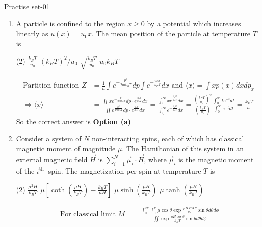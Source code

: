 \newpage
\begin{abox}
	Practise set-01
\end{abox}
\begin{enumerate}
	\item A particle is confined to the region $x \geq 0$ by a potential which increases linearly as $u(x)=u_{0} x$. The mean position of the particle at temperature $T$ is
	 \begin{tasks}(2)
		\task[\textbf{a.}] $\frac{k_{B} T}{u_{0}}$
		\task[\textbf{b.}]$\left(k_{B} T\right)^{2} / u_{0}$
		\task[\textbf{c.}]$\sqrt{\frac{k_{B} T}{u_{0}}}$
		\task[\textbf{d.}]  $u_{0} k_{B} T$
	\end{tasks}
\begin{answer}
	\begin{align*}
	\text{Partition function }Z&=\frac{1}{h} \int e^{-\frac{p^{2}}{2 m k_{B} T}} d p \int e^{-\frac{u_{0} x}{k_{B} T}} d x\text{ and }\langle x\rangle=\int x p(x) d x d p_{x}\\
	\Rightarrow\langle x\rangle&=\frac{\iint x e^{-\frac{p^{2}}{2 m k_{B} T}} d p \cdot e^{\frac{u_{0} x}{k_{B} T}} d x}{\iint e^{\frac{p^{2}}{2 m k_{B} T}} d p \cdot e^{\frac{u_{0} x}{k_{B} T}} d x}=\frac{\int_{0}^{\infty} x e^{\frac{\mu_{0} x}{k_{B} T}} d x}{\int_{0}^{\infty} e^{-\frac{\mu_{0} x}{k_{B} T}} d x}=\frac{\left(\frac{k_{B} T}{u_{0}}\right)^{2}}{\left(\frac{k_{B} T}{u_{0}}\right)} \frac{\int_{0}^{\infty} t e^{-t} d t}{\int_{0}^{\infty} e^{-t} d t}=\frac{k_{B} T}{u_{0}}
	\end{align*}
	So the correct answer is \textbf{Option (a)}
\end{answer}
\item 	Consider a system of $N$ non-interacting spins, each of which has classical magnetic moment of magnitude $\mu$. The Hamiltonian of this system in an external magnetic field $\vec{H}$ is $\sum_{i=1}^{N} \vec{\mu}_{i} \cdot \vec{H}$, where $\vec{\mu}_{i}$ is the magnetic moment of the $i^{\text {th }}$ spin. The magnetization per spin at temperature $T$ is
	 \begin{tasks}(2)
		\task[\textbf{a.}]$\frac{\mu^{2} H}{k_{B} T}$
		\task[\textbf{b.}]$\mu\left[\operatorname{coth}\left(\frac{\mu H}{k_{B} T}\right)-\frac{k_{B} T}{\mu H}\right]$
		\task[\textbf{c.}] $\mu \sinh \left(\frac{\mu H}{k_{B} T}\right)$
		\task[\textbf{d.}] $\mu \tanh \left(\frac{\mu H}{k_{B} T}\right)$
	\end{tasks}
\begin{answer}
	\begin{align*}
	\text { For classical limit } M&=\frac{\int_{0}^{2 \pi} \int_{0}^{\pi} \mu \cos \theta \exp \frac{\mu H \cos \theta}{k T} \sin \theta d \theta d \phi}{\iint \exp \frac{\mu H \cos \theta}{k_{B} T} \sin \theta d \theta d \phi} \\

\end{align*}
\end{answer}
\end{enumerate}
